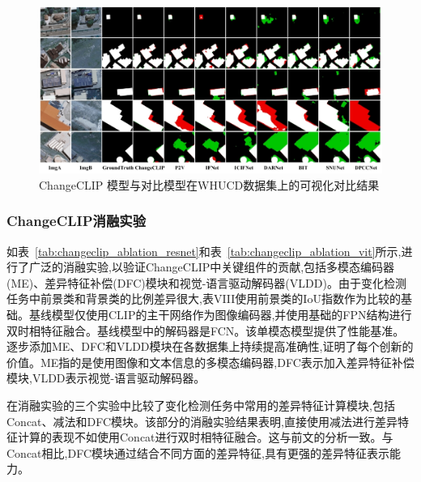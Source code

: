 \begin{figure}[!htbp]
  \centering
  \includegraphics[width=\textwidth]{paper_figures/基于AI基础模型微调的变化检测模型研究/ChangeCLIP/changeclip_whucd.png}
  \caption{ChangeCLIP 模型与对比模型在WHUCD数据集上的可视化对比结果}
  \label{fig:changeclip_whucd}
\end{figure}


\subsubsection{ChangeCLIP消融实验}

如表~\ref{tab:changeclip_ablation_resnet}和表~\ref{tab:changeclip_ablation_vit}所示,进行了广泛的消融实验,以验证ChangeCLIP中关键组件的贡献,包括多模态编码器(ME)、差异特征补偿(DFC)模块和视觉-语言驱动解码器(VLDD)。由于变化检测任务中前景类和背景类的比例差异很大,表VIII使用前景类的IoU指数作为比较的基础。基线模型仅使用CLIP的主干网络作为图像编码器,并使用基础的FPN结构进行双时相特征融合。基线模型中的解码器是FCN。该单模态模型提供了性能基准。逐步添加ME、DFC和VLDD模块在各数据集上持续提高准确性,证明了每个创新的价值。ME指的是使用图像和文本信息的多模态编码器,DFC表示加入差异特征补偿模块,VLDD表示视觉-语言驱动解码器。

在消融实验的三个实验中比较了变化检测任务中常用的差异特征计算模块,包括Concat、减法和DFC模块。该部分的消融实验结果表明,直接使用减法进行差异特征计算的表现不如使用Concat进行双时相特征融合。这与前文的分析一致。与Concat相比,DFC模块通过结合不同方面的差异特征,具有更强的差异特征表示能力。

